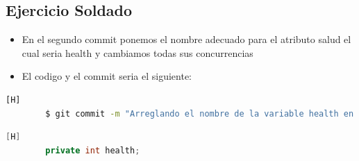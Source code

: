 \documentclass{article}
\begin{document}
	\subsection{Ejercicio Soldado}
	\begin{itemize}	
		\item En el segundo commit ponemos el nombre adecuado para el atributo salud el cual seria health y cambiamos todas sus concurrencias 
		\item El codigo y el commit seria el siguiente:
	\end{itemize}	
	\begin{lstlisting}[language=bash,caption={Commit}][H]
		$ git commit -m "Arreglando el nombre de la variable health en la clase soldado "
	\end{lstlisting}	
	\begin{lstlisting}[language=java,caption={Las lineas de codigos del metodo creado:}][H]
		private int health;
	\end{lstlisting}
\end{document}
